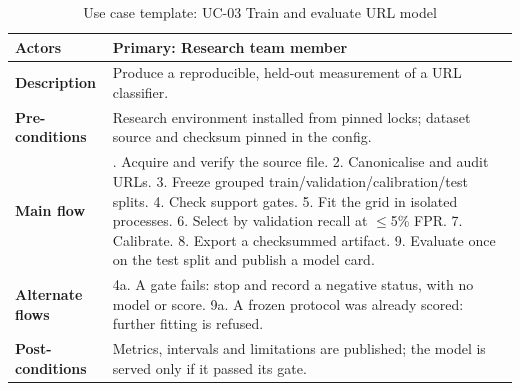 \begin{table}[H]
\centering
\footnotesize
\renewcommand{\arraystretch}{1.2}
\caption{Use case template: UC-03 Train and evaluate URL model}
\label{tab:uc3}
\begin{tabular}{|>{\raggedright\arraybackslash}p{2.9cm}|>{\raggedright\arraybackslash}p{12.0cm}|}
\hline
\textbf{Actors} & Primary: Research team member \\ \hline
\textbf{Description} & Produce a reproducible, held-out measurement of a URL classifier. \\ \hline
\textbf{Pre-conditions} & Research environment installed from pinned locks; dataset source and checksum pinned in the config. \\ \hline
\textbf{Main flow} & 1. Acquire and verify the source file. 2. Canonicalise and audit URLs. 3. Freeze grouped train/validation/calibration/test splits. 4. Check support gates. 5. Fit the grid in isolated processes. 6. Select by validation recall at $\le$5\% FPR. 7. Calibrate. 8. Export a checksummed artifact. 9. Evaluate once on the test split and publish a model card. \\ \hline
\textbf{Alternate flows} & 4a. A gate fails: stop and record a negative status, with no model or score. 9a. A frozen protocol was already scored: further fitting is refused. \\ \hline
\textbf{Post-conditions} & Metrics, intervals and limitations are published; the model is served only if it passed its gate. \\ \hline
\end{tabular}
\end{table}


